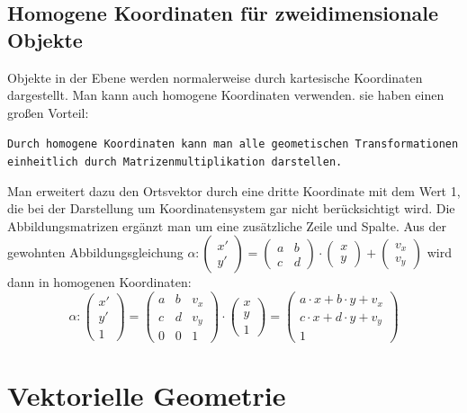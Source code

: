 \documentclass[a4paper,10pt,DIV9, BCOR12mm, oneside,openright,openbib]{scrreprt}
\theoremstyle{definition}
\theoremstyle{plain}
\begin{document}
 \subsection{Homogene Koordinaten für zweidimensionale Objekte}
Objekte in der Ebene werden normalerweise durch kartesische Koordinaten dargestellt. Man kann auch homogene Koordinaten verwenden. sie haben einen großen Vorteil:
 \begin{center}
  \texttt{Durch homogene Koordinaten kann man alle geometischen Transformationen einheitlich durch Matrizenmultiplikation darstellen.}
 \end{center}
 Man erweitert dazu den Ortsvektor durch eine dritte Koordinate mit dem Wert 1, die bei der Darstellung um Koordinatensystem gar nicht berücksichtigt wird. Die Abbildungsmatrizen ergänzt man um eine zusätzliche Zeile und Spalte.
 Aus der gewohnten Abbildungsgleichung $\alpha\colon \begin{pmatrix} x' \\ y' \end{pmatrix} = \begin{pmatrix} a & b \\ c & d \end{pmatrix} \cdot \begin{pmatrix} x \\ y \end{pmatrix} + \begin{pmatrix} v_x \\ v_y \end{pmatrix}$ wird dann in homogenen Koordinaten: 
 \[ \alpha\colon \begin{pmatrix} x' \\ y' \\ 1 \end{pmatrix} = \begin{pmatrix} a & b & v_x \\ c & d & v_y \\ 0 & 0 & 1 \end{pmatrix} \cdot \begin{pmatrix} x \\ y \\ 1 \end{pmatrix} = \begin{pmatrix} a \cdot x + b \cdot y + v_x \\ c \cdot x + d \cdot y + v_y \\ 1 \end{pmatrix}  \]
 
 
\section{Vektorielle Geometrie}
\end{document}
